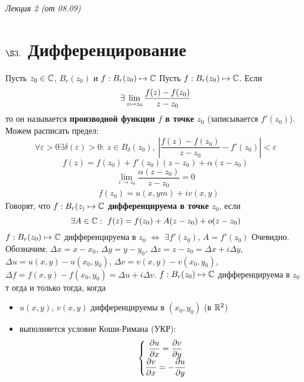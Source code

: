 \begin{flushright}
    \textit{Лекция 2 (от 08.09)}
\end{flushright}
\section{$\S 3.$ Дифференцирование}
Пусть $z_0 \in \mathbb{C}$, $B_r(z_0)$ и $f: B_r(z_0) \mapsto \mathbb{C}$
\Def
Пусть $f: B_r(z_0) \mapsto \mathbb{C}$. Если
\begin{equation}\label{(3.1)}
    \exists \displaystyle \lim_{z \mapsto z_0} \frac{f(z)-f(z_0)}{z-z_0}
\end{equation}
то он называется \textbf{производной функции $f$ в точке $z_0$} (записывается
$f'(z_0)$).
\\
Можем расписать предел:
\begin{equation}\label{(3.2)}
    \forall \varepsilon > 0 \exists \delta(\varepsilon)>0: \ z \in B_\delta(z_0), \ \left| \frac{f(z) - f(z_0)}{z-z_0} - f'(z_0) \right| < \varepsilon
\end{equation}
\begin{equation}\label{(3.3)}
    f(z) = f(z_0) + f'(z_0)(z-z_0) + \alpha(z-z_0)
\end{equation}
\begin{equation}\label{(3.4)}
    \lim_{z \to z_0}\frac{\alpha(z-z_0)}{z-z_0} = 0
\end{equation}
\begin{align*}
  & f(z_0) = u(x,ym) + iv(x,y)
\end{align*}
\Def
Говорят, что $f: B_r(z_) \mapsto \mathbb{C}$ \textbf{дифференцируема в точке $z_0$},
если
\begin{equation}\label{(3.5)}
    \exists A \in \mathbb{C}: \ f(z) = f(z_0)+A(z-z_0)+o(z-z_0)
\end{equation}
\lemma
$f: B_r(z_0) \mapsto \mathbb{C}$ дифференцируема в $z_0$ $\Leftrightarrow$ $\exists
f'(z_0)$, $A = f'(z_0)$
\pr
Очевидно.
\\
Обозначим: $\Delta x = x-x_0$, $\Delta y = y - y_0$, $\Delta z = z-z_0 = \Delta
x + i \Delta y$, $\Delta u = u(x,y)-u(x_0,y_0)$, $\Delta v = v(x,y)-v(x_0,y_0)$,
$\Delta f = f(x,y)-f(x_0,y_0) = \Delta u + i \Delta v$.
\theorem
$f: B_r(z_0) \mapsto \mathbb{C}$ дифференцируема в $z_0$ т огда и только тогда, когда
\begin{itemize}
    \item $u(x,y)$, $v(x,y)$ дифференцируемы в $(x_0,y_0)$ (в $\mathbb{R}^2$)
    \item выполняется условие Коши-Римана (УКР):
    \begin{equation}\label{(3.6)}
        \left\{ \begin{matrix}
                \displaystyle \frac{\partial u}{\partial x} = \displaystyle \frac{\partial v}{\partial y} \\
                \displaystyle \frac{\partial v}{\partial x} = - \displaystyle \frac{\partial u}{\partial y}
            \end{matrix} \right.
    \end{equation}
\end{itemize}
